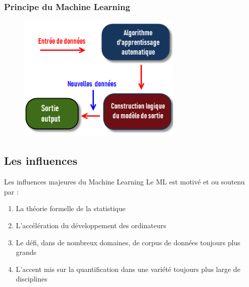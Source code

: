 \documentclass{beamer}
\begin{document}
\begin{frame}
\end{frame}



\begin{frame}
	\frametitle{Principe du Machine Learning}
	
	\begin{figure}
		\centering
		\includegraphics[width=0.7\textwidth]{ml-shema.png}
	\end{figure}

	
\end{frame}

\subsection{Les influences}
\begin{frame}{Les influences majeures du Machine Learning}
Le ML est motivé et ou soutenu par :

\begin{enumerate}
	\item La théorie formelle de la statistique
	\item L’accélération du développement des ordinateurs
	\item Le défi, dans de nombreux domaines, de corpus de données toujours plus grands
	\item L’accent mis sur la quantification dans une variété toujours plus large de disciplines
\end{enumerate}
\end{frame}
\end{document}
